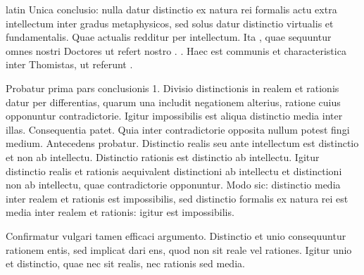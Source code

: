 \begin{otherlanguage*}{latin}
\pstart
 Unica conclusio: nulla datur distinctio ex natura rei formalis actu extra intellectum inter gradus metaphysicos, sed solus datur distinctio virtualis et fundamentalis. Quae actualis redditur per intellectum. Ita , quae sequuntur omnes nostri Doctores ut refert nostro . . Haec est communis et characteristica inter Thomistas, ut referunt . 
\pend

\pstart
 Probatur prima pars conclusionis 1. Divisio distinctionis in realem et rationis datur per differentias, quarum una includit negationem alterius, ratione cuius opponuntur contradictorie. Igitur impossibilis est aliqua distinctio media inter illas. Consequentia patet. Quia inter contradictorie opposita nullum potest fingi medium. Antecedens probatur. Distinctio realis seu ante intellectum est distinctio et non ab intellectu. Distinctio rationis est distinctio ab intellectu. Igitur distinctio realis et rationis aequivalent distinctioni ab intellectu et distinctioni non ab intellectu, quae contradictorie opponuntur. Modo sic: distinctio media inter realem et rationis est impossibilis, sed distinctio formalis ex natura rei est media inter realem et rationis: igitur est impossibilis. 
\pend

\pstart
 Confirmatur vulgari tamen efficaci argumento. Distinctio et unio consequuntur rationem entis, sed implicat dari ens, quod non sit reale vel rationes. Igitur unio et distinctio, quae nec sit realis, nec rationis sed media. 
\pend


\end{otherlanguage*}
